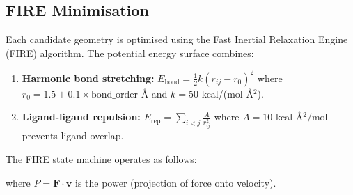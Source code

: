 \documentclass[11pt,a4paper]{article}
\begin{document}
\subsection{FIRE Minimisation}

Each candidate geometry is optimised using the Fast Inertial Relaxation
Engine (FIRE) algorithm.  The potential energy surface combines:

\begin{enumerate}
  \item \textbf{Harmonic bond stretching:}
        $E_\text{bond} = \frac{1}{2} k (r_{ij} - r_0)^2$
        where $r_0 = 1.5 + 0.1 \times \text{bond\_order}$ \AA{}
        and $k = 50$ kcal/(mol \AA$^2$).

  \item \textbf{Ligand-ligand repulsion:}
        $E_\text{rep} = \sum_{i<j} \frac{A}{r_{ij}^2}$
        where $A = 10$ kcal \AA$^2$/mol prevents ligand overlap.
\end{enumerate}

The FIRE state machine operates as follows:

\begin{center}
\end{center}

\noindent where $P = \mathbf{F} \cdot \mathbf{v}$ is the power
(projection of force onto velocity).

\end{document}
